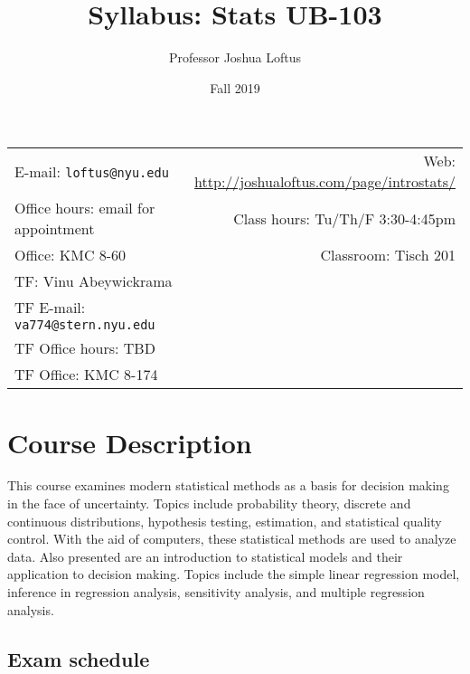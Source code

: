 \documentclass[11pt]{article}
\title{Syllabus: Stats UB-103}
\author{Professor Joshua Loftus}
\date{Fall 2019}
\newcommand{\blankline}{\quad\pagebreak[2]}
\begin{document}
\maketitle

\blankline

\begin{tabular*}{.93\textwidth}{@{\extracolsep{\fill}}lr}


E-mail: \texttt{loftus@nyu.edu} & Web: \url{http://joshualoftus.com/page/introstats/}  \\

 Office hours: email for appointment  &  Class hours: Tu/Th/F 3:30-4:45pm \\

 Office: KMC 8-60 & Classroom: Tisch 201 \\
TF: Vinu Abeywickrama \\
TF E-mail: \texttt{va774@stern.nyu.edu} & \\
TF Office hours: TBD &  \\
TF Office: KMC 8-174 \\
\hline
\end{tabular*}

\vspace{5 mm}


\section*{Course Description}

This course examines modern statistical methods as a basis for decision making in the face of uncertainty. Topics include probability theory, discrete and continuous distributions, hypothesis testing, estimation, and statistical quality control. With the aid of computers, these statistical methods are used to analyze data. Also presented are an introduction to statistical models and their application to decision making. Topics include the simple linear regression model, inference in regression analysis, sensitivity analysis, and multiple regression analysis.

\subsection*{Exam schedule}
\end{document}
